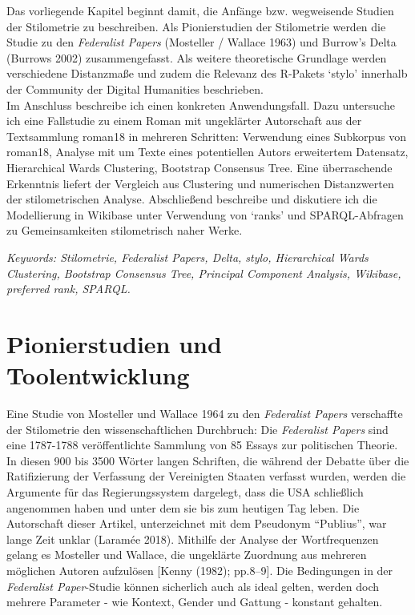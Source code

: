 \documentclass[
  12pt,
  letterpaper,
]{classicthesis}
\begin{document}
Das vorliegende Kapitel beginnt damit, die Anfänge bzw. wegweisende
Studien der Stilometrie zu beschreiben. Als Pionierstudien der
Stilometrie werden die Studie zu den \emph{Federalist Papers} (Mosteller
/ Wallace 1963) und Burrow's Delta (Burrows 2002) zusammengefasst. Als
weitere theoretische Grundlage werden verschiedene Distanzmaße und zudem
die Relevanz des R-Pakets `stylo' innerhalb der Community der Digital
Humanities beschrieben.\\
Im Anschluss beschreibe ich einen konkreten Anwendungsfall. Dazu
untersuche ich eine Fallstudie zu einem Roman mit ungeklärter
Autorschaft aus der Textsammlung roman18 in mehreren Schritten:
Verwendung eines Subkorpus von roman18, Analyse mit um Texte eines
potentiellen Autors erweitertem Datensatz, Hierarchical Wards
Clustering, Bootstrap Consensus Tree. Eine überraschende Erkenntnis
liefert der Vergleich aus Clustering und numerischen Distanzwerten der
stilometrischen Analyse. Abschließend beschreibe und diskutiere ich die
Modellierung in Wikibase unter Verwendung von `ranks' und
SPARQL-Abfragen zu Gemeinsamkeiten stilometrisch naher Werke.

\emph{Keywords: Stilometrie, Federalist Papers, Delta, stylo,
Hierarchical Wards Clustering, Bootstrap Consensus Tree, Principal
Component Analysis, Wikibase, preferred rank, SPARQL.}

\section{Pionierstudien und
Toolentwicklung}\label{pionierstudien-und-toolentwicklung}

Eine Studie von Mosteller und Wallace 1964 zu den \emph{Federalist
Papers} verschaffte der Stilometrie den wissenschaftlichen Durchbruch:
Die \emph{Federalist Papers} sind eine 1787-1788 veröffentlichte
Sammlung von 85 Essays zur politischen Theorie. In diesen 900 bis 3500
Wörter langen Schriften, die während der Debatte über die Ratifizierung
der Verfassung der Vereinigten Staaten verfasst wurden, werden die
Argumente für das Regierungssystem dargelegt, dass die USA schließlich
angenommen haben und unter dem sie bis zum heutigen Tag leben. Die
Autorschaft dieser Artikel, unterzeichnet mit dem Pseudonym ``Publius'',
war lange Zeit unklar (Laramée 2018). Mithilfe der Analyse der
Wortfrequenzen gelang es Mosteller und Wallace, die ungeklärte Zuordnung
aus mehreren möglichen Autoren aufzulösen {[}Kenny (1982); pp.8--9{]}.
Die Bedingungen in der \emph{Federalist Paper}-Studie können sicherlich
auch als ideal gelten, werden doch mehrere Parameter - wie Kontext,
Gender und Gattung - konstant gehalten.
\end{document}
